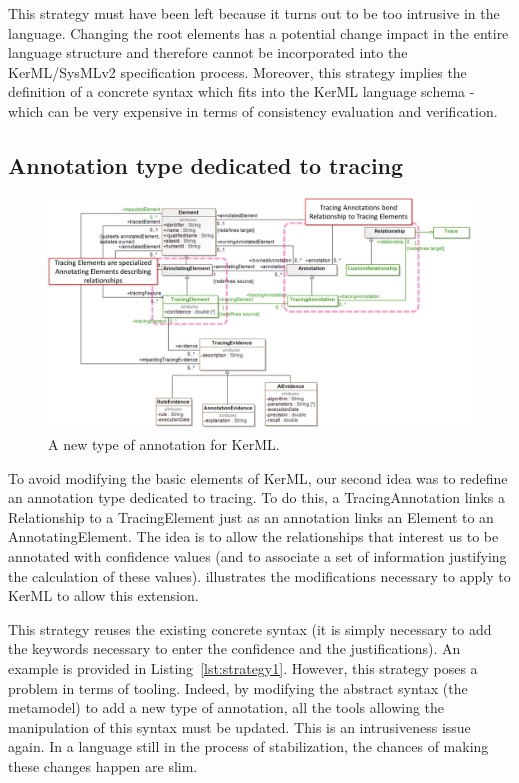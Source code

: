 This strategy must have been left because it turns out to be too intrusive in the language. Changing the root elements has a potential change impact in the entire language structure and therefore cannot be incorporated into the KerML/SysMLv2 specification process. Moreover, this strategy implies the definition of a concrete syntax which fits into the {KerML} language schema - which can be very expensive in terms of consistency evaluation and verification.

\subsection{Annotation type dedicated to tracing}
\begin{figure}[ht]     
	\centering
	\includegraphics[width=.99\linewidth]{images/strategy2-annotation.jpg}
	\caption{A new type of annotation for {KerML}.}
	\label{fig:strategy2}
\end{figure}
To avoid modifying the basic elements of {KerML}, our second idea was to redefine an annotation type dedicated to tracing. To do this, a TracingAnnotation links a Relationship to a TracingElement just as an annotation links an Element to an AnnotatingElement. The idea is to allow the relationships that interest us to be annotated with confidence values (and to associate a set of information justifying the calculation of these values).  illustrates the modifications necessary to apply to {KerML} to allow this extension.

This strategy reuses the existing concrete syntax (it is simply necessary to add the keywords necessary to enter the confidence and the justifications). An example is provided in Listing~\ref{lst:strategy1}.
However, this strategy poses a problem {in terms of tooling}. Indeed, by modifying the abstract syntax (the metamodel) to add a new type of annotation, all the tools allowing the manipulation of this syntax must be updated.
{This is an intrusiveness issue again. In a language still in the process of stabilization, the chances of making these changes happen are slim.}


